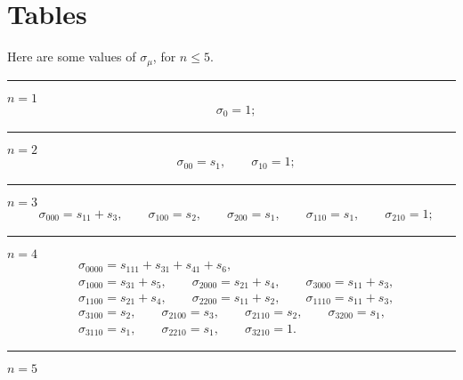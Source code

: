 \documentclass[12pt]{amsart}
\theoremstyle{plain}
\theoremstyle{definition}
\theoremstyle{remark}
\begin{document}
\section{Tables}
Here are some values of $\sigma_\mu$, for $n\leq 5$.
\medskip
\hrule
\medskip
$n=1$ 
\begin{align*}
&\sigma_{0} =1;
\end{align*}
\hrule
\medskip
$n=2$ 
\begin{align*}
&\sigma_{00} =s_{1},\qquad   \sigma_{10} =1; 
\end{align*}
\hrule
\medskip
$n=3$ 
\begin{align*}
&\sigma_{000} =s_{11} + s_{3},\qquad   
\sigma_{100} =s_{2},\qquad    
\sigma_{200} =s_{1},\qquad    
\sigma_{110} =s_{1},\qquad    
\sigma_{210} =1;
\end{align*}
\hrule
\medskip
$n=4$ 
\begin{align*}
&
\sigma_{0000} =s_{111} + s_{31} + s_{41} + s_{6},
\\ &
\sigma_{1000} =s_{31} + s_{5},\qquad 
\sigma_{2000} =s_{21} + s_{4},\qquad 
\sigma_{3000} =s_{11} + s_{3},
\\ &
\sigma_{1100} =s_{21} + s_{4},\qquad 
\sigma_{2200} =s_{11} + s_{2},\qquad  
\sigma_{1110} =s_{11} + s_{3},
\\ &
\sigma_{3100} =s_{2},\qquad  
\sigma_{2100} =s_{3},\qquad 
\sigma_{2110} =s_{2},\qquad  
\sigma_{3200} =s_{1},
\\&
\sigma_{3110} =s_{1},\qquad  
\sigma_{2210} =s_{1},\qquad 
\sigma_{3210} =1.
\end{align*}
\hrule
\medskip
$n=5$ 
\end{document}
